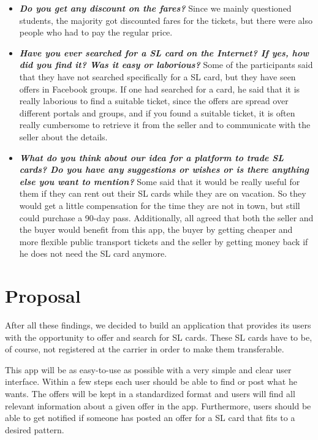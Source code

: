 \documentclass[11pt,twoside,a4paper]{report}
\begin{document}
\begin{itemize}
\item \textbf{\textit{Do you get any discount on the fares?}} Since we mainly questioned students, the majority got discounted fares for the tickets, but there were also people who had to pay the regular price.
\item \textbf{\textit{Have you ever searched for a SL card on the Internet? If yes, how did you find it? Was it easy or laborious?}} Some of the participants said that they have not searched specifically for a SL card, but they have seen offers in Facebook groups. If one had searched for a card, he said that it is really laborious to find a suitable ticket, since the offers are spread over different portals and groups, and if you found a suitable ticket, it is often really cumbersome to retrieve it from the seller and to communicate with the seller about the details.
\item \textbf{\textit{What do you think about our idea for a platform to trade SL cards? Do you have any suggestions or wishes or is there anything else you want to mention?}} Some said that it would be really useful for them if they can rent out their SL cards while they are on vacation. So they would get a little compensation for the time they are not in town, but still could purchase a 90-day pass. Additionally, all agreed that both the seller and the buyer would benefit from this app, the buyer by getting cheaper and more flexible public transport tickets and the seller by getting money back if he does not need the SL card anymore.
\end{itemize}

\section{Proposal}

After all these findings, we decided to build an application that provides its users with the opportunity to offer and search for SL cards. These SL cards have to be, of course, not registered at the carrier in order to make them transferable.

This app will be as easy-to-use as possible with a very simple and clear user interface. Within a few steps each user should be able to find or post what he wants. The offers will be kept in a standardized format and users will find all relevant information about a given offer in the app. Furthermore, users should be able to get notified if someone has posted an offer for a SL card that fits to a desired pattern.
\end{document}

